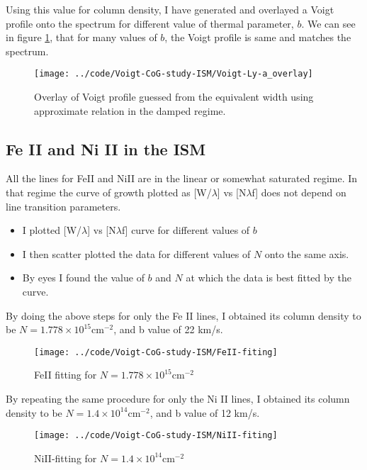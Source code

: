 \documentclass[12pt]{article}
\begin{document}
Using this value for column density, I have generated and overlayed a Voigt profile onto the spectrum for different value of thermal parameter, $b$. We can see in figure \ref{fig:voigt-ly-a_overlay}, that for many values of $b$, the Voigt profile is same and matches the spectrum.

 
\begin{figure}[H]
\centering
\texttt{[image: ../code/Voigt-CoG-study-ISM/Voigt-Ly-a\_overlay]}
\caption{Overlay of Voigt profile guessed from the equivalent width using approximate relation in the damped regime.}
\label{fig:voigt-ly-a_overlay}
\end{figure}
 
\newpage 
\subsection{Fe II and Ni II in the ISM}
All the lines for FeII and NiII are in the linear or somewhat saturated regime. In that regime the curve of growth plotted as  [W/$\lambda$] vs [N$\lambda$f] does not depend on line transition parameters.
\begin{itemize}
\item{ I plotted [W/$\lambda$] vs [N$\lambda$f] curve for different values of $b$}
\item{I then scatter plotted the data for different values of $N$ onto the same axis.}
\item{By eyes I found the value of $b$ and $N$ at which the data is best fitted by the curve.}
\end{itemize}

By doing the above steps for only the Fe II lines, I obtained its column density to be $N=1.778 \times 10^{15}$cm$^{-2}$, and b value of 22 km/s.


\begin{figure}[H]
	\centering
	\texttt{[image: ../code/Voigt-CoG-study-ISM/FeII-fiting]}
	\caption{FeII fitting for $N=1.778 \times 10^{15}$cm$^{-2}$}
	\label{fig:feii-fiting}
\end{figure}

\newpage

By repeating the same procedure for only the Ni II lines, I obtained its column density to be $N=1.4 \times 10^{14}$cm$^{-2}$, and b value of 12 km/s.

\begin{figure}[H]
	\centering
	\texttt{[image: ../code/Voigt-CoG-study-ISM/NiII-fiting]}
	\caption{NiII-fitting for $N=1.4 \times 10^{14}$cm$^{-2}$}
	\label{fig:niii-fiting}
\end{figure}
\end{document}
